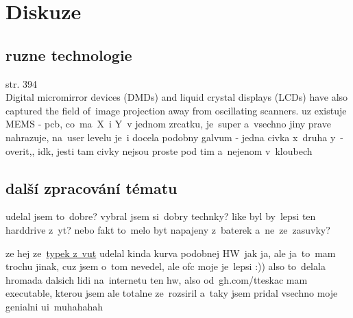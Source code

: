 \chapter{Diskuze}
\section{ruzne technologie}
\cite{scanning-handbook} str. 394 \\
Digital micromirror devices (DMDs) and
liquid crystal displays (LCDs) have also captured the field of~image projection away from
oscillating scanners.
uz existuje MEMS \cite{mems-review}- pcb, co~ma~X~i Y~v jednom zrcatku, je~super a~vsechno jiny prave nahrazuje, na~user levelu je~i docela podobny galvum - jedna civka x~druha y~- overit,, idk, jesti tam civky nejsou proste pod tim a~nejenom v~kloubech



\section{další zpracování tématu}
udelal jsem to~dobre? vybral jsem si~dobry technky?
like byl by~lepsi ten harddrive z~yt?
nebo fakt to~melo byt napajeny z~baterek a~ne~ze~zasuvky?

ze hej ze~\href{https://dspace.vutbr.cz/bitstream/handle/11012/38621/final-thesis.pdf?sequence=-1}{typek z~vut} udelal kinda kurva podobnej HW~jak ja, ale ja~to~mam trochu jinak, cuz jsem o~tom nevedel, ale ofc moje je~lepsi :))
also to~delala hromada dalsich lidi na~internetu ten hw, also od~gh.com/tteskac mam executable, kterou jsem ale totalne ze~rozsiril a~taky jsem pridal vsechno moje genialni ui~muhahahah

